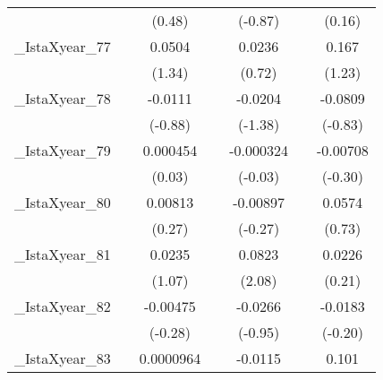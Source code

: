 {\begin{tabular}{l*{6}{c}}
            &                     &      (0.48)         &                     &     (-0.87)         &                     &      (0.16)         \\
[1em]
\_IstaXyear\_77&                     &      0.0504         &                     &      0.0236         &                     &       0.167         \\
            &                     &      (1.34)         &                     &      (0.72)         &                     &      (1.23)         \\
[1em]
\_IstaXyear\_78&                     &     -0.0111         &                     &     -0.0204         &                     &     -0.0809         \\
            &                     &     (-0.88)         &                     &     (-1.38)         &                     &     (-0.83)         \\
[1em]
\_IstaXyear\_79&                     &    0.000454         &                     &   -0.000324         &                     &    -0.00708         \\
            &                     &      (0.03)         &                     &     (-0.03)         &                     &     (-0.30)         \\
[1em]
\_IstaXyear\_80&                     &     0.00813         &                     &    -0.00897         &                     &      0.0574         \\
            &                     &      (0.27)         &                     &     (-0.27)         &                     &      (0.73)         \\
[1em]
\_IstaXyear\_81&                     &      0.0235         &                     &      0.0823\sym{*}  &                     &      0.0226         \\
            &                     &      (1.07)         &                     &      (2.08)         &                     &      (0.21)         \\
[1em]
\_IstaXyear\_82&                     &    -0.00475         &                     &     -0.0266         &                     &     -0.0183         \\
            &                     &     (-0.28)         &                     &     (-0.95)         &                     &     (-0.20)         \\
[1em]
\_IstaXyear\_83&                     &   0.0000964         &                     &     -0.0115         &                     &       0.101         \\

\end{tabular}}
